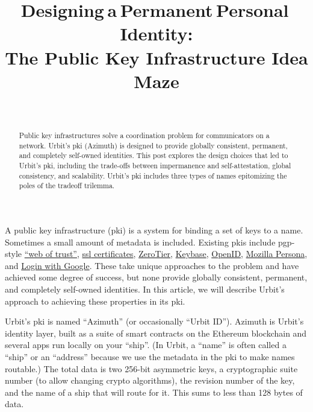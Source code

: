 \documentclass[twoside]{article}
\title{Designing a Permanent Personal Identity: \\ The Public Key Infrastructure Idea Maze}
\author{\authorname~\authorpatp \\ \affiliation}
\date{}
\begin{document}
\maketitle
\thispagestyle{firststyle}

\begin{abstract}
\sloppy
Public key infrastructures solve a coordination problem for communicators on a network. Urbit's {\sc pki} (Azimuth) is designed to provide globally consistent, permanent, and completely self-owned identities. This post explores the design choices that led to Urbit's {\sc pki}, including the trade-offs between impermanence and self-attestation, global consistency, and scalability. Urbit's {\sc pki} includes three types of names epitomizing the poles of the tradeoff trilemma.
\end{abstract}

\setcounter{page}{1}


A public key infrastructure ({\sc pki}) is a system for binding a set of keys to a name. Sometimes a small amount of metadata is included. Existing {\sc pki}s include {\sc pgp}-style
\href{https://en.wikipedia.org/wiki/Web_of_trust}{``web of trust''},
\href{https://en.wikipedia.org/wiki/Certificate_authority}{{\sc ssl}
certificates},
\href{https://www.zerotier.com/lf-announcement/}{ZeroTier},
\href{https://keybase.io/}{Keybase},
\href{https://openid.net/what-is-openid/}{OpenID},
\href{https://developer.mozilla.org/en-US/docs/Archive/Mozilla/Persona}{Mozilla
Persona}, and \href{https://developers.google.com/identity}{Login with
Google}. These take unique approaches to the problem and have achieved
some degree of success, but none provide globally consistent, permanent,
and completely self-owned identities. In this article, we will describe Urbit's approach to achieving these properties in its {\sc pki}.

Urbit's {\sc pki} is named ``Azimuth'' (or occasionally ``Urbit ID'').  Azimuth is Urbit's identity layer, built as a suite of smart contracts on the Ethereum blockchain and several apps run locally on your ``ship''. (In Urbit, a ``name'' is often called a ``ship'' or an ``address''
because we use the metadata in the {\sc pki} to make names routable.) The total
data is two 256-bit asymmetric keys, a cryptographic suite number (to
allow changing crypto algorithms), the revision number of the key, and
the name of a ship that will route for it. This sums to less than 128
bytes of data.
\end{document}
